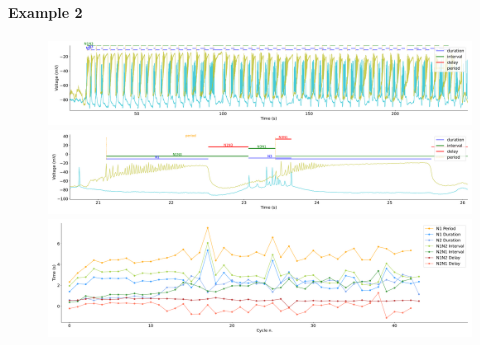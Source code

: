 \paragraph{\large{Example 2}}


\begin{figure}[htbp]
	\centering
	\begin{minipage}[b]{\textwidth}
		\centering
		\includegraphics[width=\textwidth,height=0.1\textheight]{./invariants/data/SUSSEX/CV1a_driven2/images/stim_cv1a2_signal_intervals_zoom.pdf}
		\includegraphics[width=\textwidth]{./invariants/data/SUSSEX/CV1a_driven2/images/stim_cv1a2_signal_intervals_cycle.pdf}
		\includegraphics[width=\textwidth]{./invariants/data/SUSSEX/CV1a_driven2/images/stim_cv1a2_time_cycle.pdf}
	\end{minipage}
	\centering
	\begin{minipage}[b]{0.43\textwidth}
		\centering

\end{minipage}
\end{figure}

